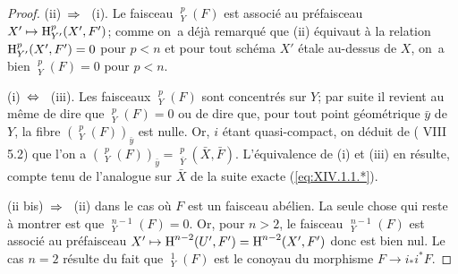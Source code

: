 \begin{proof}
\textup{(ii)}~$\To$~ \textup{(i)}. Le faisceau ${\mathop{\underline{\mathrm{H}}}\nolimits}_Y^p(F)$ est associ\'e au pr\'efaisceau $X'\mto \H_{Y'}^p(X', F')$; comme on~a d\'ej\`a remarqu\'e que \textup{(ii)} \'equivaut \`a la relation $\operatorname{H}_{Y'}^p(X', F')=0$ pour $p<n$ et pour tout sch\'ema $X'$ \'etale au-dessus de $X$, on~a bien ${\mathop{\underline{\mathrm{H}}}\nolimits}_Y^p(F)=0$ pour $p<n$.

\textup{(i)}~$\Ssi$~ \textup{(iii)}. Les faisceaux ${\mathop{\underline{\mathrm{H}}}\nolimits}_Y^p(F)$ sont concentr\'es sur $Y$; par suite il revient au m\^eme de dire que ${\mathop{\underline{\mathrm{H}}}\nolimits}_Y^p(F)=0$ ou de dire que, pour tout point g\'eom\'etrique $\bar y$ de $Y$, la fibre $({\mathop{\underline{\mathrm{H}}}\nolimits}_Y^p(F))_{\bar y}$ est nulle. Or, $i$ \'etant quasi-compact, on d\'eduit de ( VIII 5.2) que l'on a $({\mathop{\underline{\mathrm{H}}}\nolimits}_Y^p(F))_{\bar y}={\mathop{\underline{\mathrm{H}}}\nolimits}_{\bar Y}^p(\bar X, \bar F)$. L'\'equivalence de \textup{(i)} et \textup{(iii)} en r\'esulte, compte tenu de l'analogue sur $\bar X$ de la suite exacte (\ref{eq:XIV.1.1.*}).

(ii bis)~$\To$~ \textup{(ii)} dans le cas o\`u $F$ est un faisceau ab\'elien. La seule chose qui reste \`a montrer est que ${\mathop{\underline{\mathrm{H}}}\nolimits}_Y^{n-1}(F)=0$. Or, pour $n>2$, le faisceau ${\mathop{\underline{\mathrm{H}}}\nolimits}_Y^{n-1}(F)$ est associ\'e au pr\'efaisceau $X'\mto \H^{n-2}(U', F')=\H^{n-2}(X', F')$ donc est bien nul. Le cas $n=2$ r\'esulte du fait que ${\mathop{\underline{\mathrm{H}}}\nolimits}_Y^1(F)$ est le conoyau du morphisme $F\to i_*i^*F$.
\skipqed
\end{proof}

